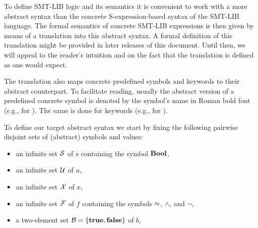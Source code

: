 To define SMT-LIB logic and its semantics it is convenient to work 
with a more abstract syntax than the concrete S-expression-based syntax 
of the SMT-LIB language.
The formal semantics of concrete SMT-LIB expressions is then given by means 
of a translation into this abstract syntax.
A formal definition of this translation might be provided in later releases 
of this document.
Until then, we will appeal to the reader's intuition and on the fact that 
the translation is defined as one would expect.

The translation also maps concrete predefined symbols and keywords
to their abstract counterpart.
To facilitate reading, usually the abstract version of 
a predefined concrete symbol is denoted by the symbol's name 
in Roman bold font (e.g.,  for ).
The same is done for keywords (e.g.,  for ).

To define our target abstract syntax we start by fixing the following pairwise disjoint
sets of (abstract) symbols and values:
\begin{itemize}
\item
an infinite set $\mathcal{S}$ of  $s$ 
containing the symbol $\textbf{Bool}$,

\item
an infinite set $\mathcal{U}$ of  $u$,

\item
an infinite set $\mathcal{X}$ of  $x$,

\item
an infinite set $\mathcal{F}$ of  $f$
containing the symbols $\approx$, $\land$, and $\lnot$,




\item
a two-element set $\mathcal{B} = \{\textbf{true}, \textbf{false}\}$ of  $b$,





\end{itemize}



